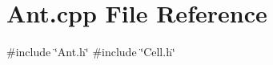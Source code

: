 \section{Ant.\+cpp File Reference}
\label{Ant_8cpp}
{\ttfamily \#include \char`\"{}Ant.\+h\char`\"{}}\newline
{\ttfamily \#include \char`\"{}Cell.\+h\char`\"{}}\newline
